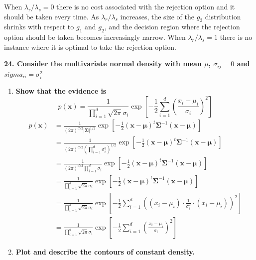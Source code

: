 \documentclass[12pt]{article}
\begin{document}
\begin{enumerate}
\begin{enumerate}
  When $\lambda_r/\lambda_s = 0$ there is no cost associated with the rejection option and it should be taken every time. As $\lambda_r/\lambda_s$ increases, the size of the $g_3$ distribution shrinks with respect to $g_1$ and $g_2$, and the decision region where the rejection option should be taken becomes increasingly narrow. When $\lambda_r/\lambda_s = 1$ there is no instance where it is optimal to take the rejection option.
  \end{enumerate}
  \subitem \textbf{24. Consider the multivariate normal density with mean $\mu$, $\sigma_{ij}=0$ and $sigma_{ii}=\sigma_i^2$}
  \begin{enumerate}
  \item \textbf{Show that the evidence is}
    \begin{equation}
      p(\mathbf{x}) = \frac{1}{\prod_{i=1}^d \sqrt{2\pi}\sigma_i} \exp\left[-\frac{1}{2}\sum_{i=1}^d\left(\frac{x_i-\mu_i}{\sigma_i}\right)^2\right]
    \end{equation}
    \begin{equation}
    \begin{split}
      p(\mathbf{x})& = \frac{1}{(2\pi)^{d/2}|\boldsymbol{\Sigma}|^{1/2}} \exp\left[-\frac{1}{2}(\mathbf{x}-\boldsymbol{\mu})^t\boldsymbol{\Sigma}^{-1}(\mathbf{x}-\boldsymbol{\mu})\right] \\
      & = \frac{1}{(2\pi)^{d/2}(\prod_{i=1}^d\sigma_i^2)^{1/2}} \exp\left[-\frac{1}{2}(\mathbf{x}-\boldsymbol{\mu})^t\boldsymbol{\Sigma}^{-1}(\mathbf{x}-\boldsymbol{\mu})\right] \\
      & = \frac{1}{(2\pi)^{d/2}\prod_{i=1}^d\sigma_i} \exp\left[-\frac{1}{2}(\mathbf{x}-\boldsymbol{\mu})^t\boldsymbol{\Sigma}^{-1}(\mathbf{x}-\boldsymbol{\mu})\right] \\
      & = \frac{1}{\prod_{i=1}^d \sqrt{2\pi}\sigma_i} \exp\left[-\frac{1}{2}(\mathbf{x}-\boldsymbol{\mu})^t\boldsymbol{\Sigma}^{-1}(\mathbf{x}-\boldsymbol{\mu})\right] \\
      & = \frac{1}{\prod_{i=1}^d \sqrt{2\pi}\sigma_i} \exp\left[-\frac{1}{2}\sum_{i=1}^d\left((x_i-\mu_i) \cdot \frac{1}{\sigma_i^2} \cdot (x_i-\mu_i)\right)^2\right] \\
      & = \frac{1}{\prod_{i=1}^d \sqrt{2\pi}\sigma_i} \exp\left[-\frac{1}{2}\sum_{i=1}^d\left(\frac{x_i-\mu_i}{\sigma_i}\right)^2\right]
    \end{split}
    \end{equation}
  \item \textbf{Plot and describe the contours of constant density.}
    \begin{figure}[H]

\end{figure}
\end{enumerate}
\end{enumerate}
\end{document}
